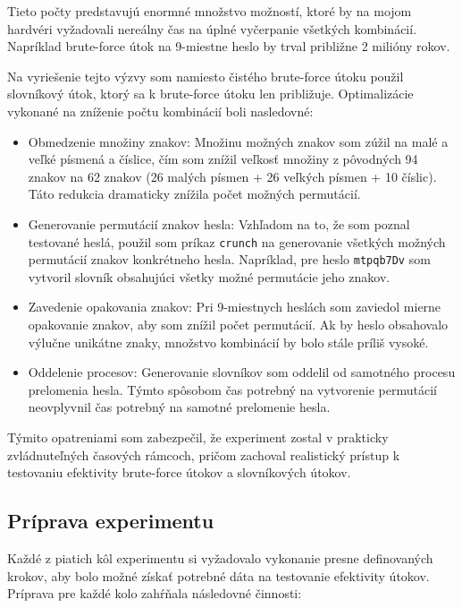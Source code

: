 \documentclass[12pt, twoside]{book}
\begin{document}
Tieto počty predstavujú enormné množstvo možností, ktoré by na mojom hardvéri vyžadovali nereálny čas na úplné vyčerpanie všetkých kombinácií. Napríklad brute-force útok na 9-miestne heslo by trval približne 2 milióny rokov.

Na vyriešenie tejto výzvy som namiesto čistého brute-force útoku použil slovníkový útok, ktorý sa k brute-force útoku len približuje. Optimalizácie vykonané na zníženie počtu kombinácií boli nasledovné:

\begin{itemize} 
\item Obmedzenie množiny znakov: Množinu možných znakov som zúžil na malé a veľké písmená a číslice, čím som znížil veľkosť množiny z pôvodných 94 znakov na 62 znakov (26 malých písmen + 26 veľkých písmen + 10 číslic). Táto redukcia dramaticky znížila počet možných permutácií. 
\item Generovanie permutácií znakov hesla: Vzhľadom na to, že som poznal testované heslá, použil som príkaz \texttt{crunch} na generovanie všetkých možných permutácií znakov konkrétneho hesla. Napríklad, pre heslo \texttt{mtpqb7Dv} som vytvoril slovník obsahujúci všetky možné permutácie jeho znakov. 
\item Zavedenie opakovania znakov: Pri 9-miestnych heslách som zaviedol mierne opakovanie znakov, aby som znížil počet permutácií. Ak by heslo obsahovalo výlučne unikátne znaky, množstvo kombinácií by bolo stále príliš vysoké.
\item Oddelenie procesov: Generovanie slovníkov som oddelil od samotného procesu prelomenia hesla. Týmto spôsobom čas potrebný na vytvorenie permutácií neovplyvnil čas potrebný na samotné prelomenie hesla. 
\end{itemize}

Týmito opatreniami som zabezpečil, že experiment zostal v prakticky zvládnuteľných časových rámcoch, pričom zachoval realistický prístup k testovaniu efektivity brute-force útokov a slovníkových útokov.


\subsection{Príprava experimentu}
Každé z piatich kôl experimentu si vyžadovalo vykonanie presne definovaných krokov, aby bolo možné získať potrebné dáta na testovanie efektivity útokov. Príprava pre každé kolo zahŕňala následovné činnosti:
\end{document}
